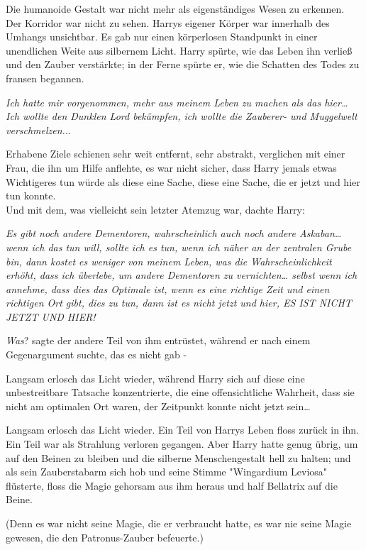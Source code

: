{Die humanoide Gestalt war nicht mehr als eigenständiges Wesen zu erkennen.\\ Der Korridor war nicht zu sehen. Harrys eigener Körper war innerhalb des Umhangs unsichtbar. Es gab nur einen körperlosen Standpunkt in einer unendlichen Weite aus silbernem Licht. Harry spürte, wie das Leben ihn verließ und den Zauber verstärkte; in der Ferne spürte er, wie die Schatten des Todes zu fransen begannen.

\emph{Ich hatte mir vorgenommen, mehr aus meinem Leben zu machen als das hier… Ich wollte den Dunklen Lord bekämpfen, ich wollte die Zauberer- und Muggelwelt verschmelzen.}..

Erhabene Ziele schienen sehr weit entfernt, sehr abstrakt, verglichen mit einer Frau, die ihn um Hilfe anflehte, es war nicht sicher, dass Harry jemals etwas Wichtigeres tun würde als diese eine Sache, diese eine Sache, die er jetzt und hier tun konnte.\\ Und mit dem, was vielleicht sein letzter Atemzug war, dachte Harry:

\emph{Es gibt noch andere Dementoren, wahrscheinlich auch noch andere Askaban… wenn ich das tun will, sollte ich es tun, wenn ich näher an der zentralen Grube bin, dann kostet es weniger von meinem Leben, was die Wahrscheinlichkeit erhöht, dass ich überlebe, um andere Dementoren zu vernichten… selbst wenn ich annehme, dass dies das Optimale ist, wenn es eine richtige Zeit und einen richtigen Ort gibt, dies zu tun, dann ist es nicht jetzt und hier, ES IST NICHT JETZT UND HIER!}

\emph{Was}? sagte der andere Teil von ihm entrüstet, während er nach einem Gegenargument suchte, das es nicht gab -

Langsam erlosch das Licht wieder, während Harry sich auf diese eine unbestreitbare Tatsache konzentrierte, die eine offensichtliche Wahrheit, dass sie nicht am optimalen Ort waren, der Zeitpunkt konnte nicht jetzt sein…

Langsam erlosch das Licht wieder. Ein Teil von Harrys Leben floss zurück in ihn. Ein Teil war als Strahlung verloren gegangen. Aber Harry hatte genug übrig, um auf den Beinen zu bleiben und die silberne Menschengestalt hell zu halten; und als sein Zauberstabarm sich hob und seine Stimme "Wingardium Leviosa" flüsterte, floss die Magie gehorsam aus ihm heraus und half Bellatrix auf die Beine.

(Denn es war nicht seine Magie, die er verbraucht hatte, es war nie seine Magie gewesen, die den Patronus-Zauber befeuerte.)

}
